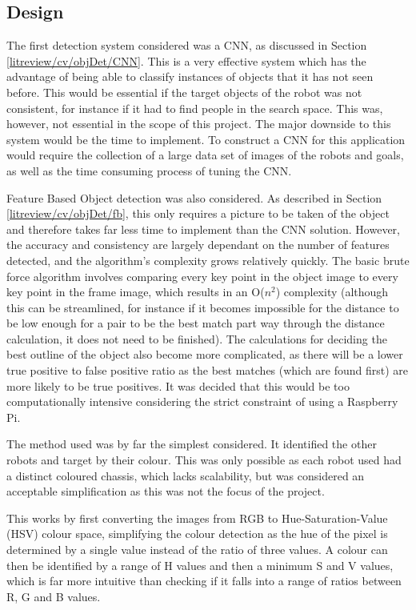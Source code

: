 \subsection{Design}\label{soft/cv/design}
The first detection system considered was a CNN, as discussed in Section \ref{litreview/cv/objDet/CNN}. This is a very effective system which has the advantage of 
being able to classify instances of objects that it has not 
seen before. This would be essential if the target objects of 
the robot was not consistent, for instance if it had to find 
people in the search space. This was, however, not essential 
in the scope of this project. The major downside to this 
system would be the time to implement. To construct a CNN for 
this application would require the collection of a large data 
set of images of the robots and goals, as well as the time 
consuming process of tuning the CNN. 

Feature Based Object detection was also considered. As described in Section \ref{litreview/cv/objDet/fb}, this only requires a picture to be taken of the object and therefore takes far less time to 
implement than the CNN solution. However, the accuracy and 
consistency are largely dependant on the number of features 
detected, and the algorithm's complexity grows relatively 
quickly. The basic brute force algorithm involves comparing 
every key point in the object image to every key point in the 
frame image, which results in an O($n^2$) complexity (although 
this can be streamlined, for instance if it becomes impossible 
for the distance to be low enough for a pair to be the best 
match part way through the distance calculation, it does not 
need to be finished). The calculations for deciding the best 
outline of the object also become more complicated, as there 
will be a lower true positive to false positive ratio as the 
best matches (which are found first) are more likely to be 
true positives. It was decided that this would be too  
computationally intensive considering the strict constraint of 
using a Raspberry Pi. 

The method used was by far the simplest considered. It identified the other robots and target by their colour. This was only possible as each robot used had a distinct coloured chassis, which lacks scalability, but was considered an acceptable simplification as this was not the focus of the project. 

This works by first converting the images from RGB to Hue-Saturation-Value (HSV) colour space, simplifying the colour detection as the hue of the pixel is determined by a single value instead of the ratio of three values. A colour can then be identified by a range of H values and then a minimum S and V values, which is far more intuitive than checking if it falls into a range of ratios between R, G and B values. 

